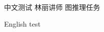\documentclass[fontset=mac]{ctexart}
\begin{document}
中文测试 林丽讲师 图推理任务\par English test
\end{document}
